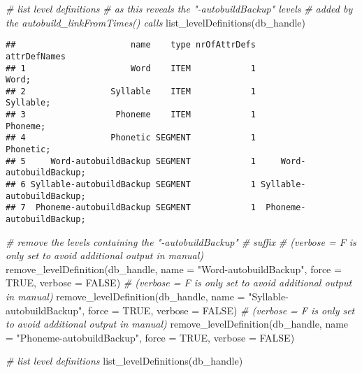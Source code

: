 \documentclass[
]{book}
\newenvironment{Shaded}{\begin{snugshade}}{\end{snugshade}}
\newcommand{\AttributeTok}[1]{\textcolor[rgb]{0.77,0.63,0.00}{#1}}
\newcommand{\CommentTok}[1]{\textcolor[rgb]{0.56,0.35,0.01}{\textit{#1}}}
\newcommand{\ConstantTok}[1]{\textcolor[rgb]{0.00,0.00,0.00}{#1}}
\newcommand{\FunctionTok}[1]{\textcolor[rgb]{0.00,0.00,0.00}{#1}}
\newcommand{\NormalTok}[1]{#1}
\newcommand{\StringTok}[1]{\textcolor[rgb]{0.31,0.60,0.02}{#1}}
\begin{document}
\begin{Shaded}
\begin{Highlighting}[]
\CommentTok{\# list level definitions}
\CommentTok{\# as this reveals the "{-}autobuildBackup" levels}
\CommentTok{\# added by the autobuild\_linkFromTimes() calls}
\FunctionTok{list\_levelDefinitions}\NormalTok{(db\_handle)}
\end{Highlighting}
\end{Shaded}

\begin{verbatim}
##                       name    type nrOfAttrDefs              attrDefNames
## 1                     Word    ITEM            1                     Word;
## 2                 Syllable    ITEM            1                 Syllable;
## 3                  Phoneme    ITEM            1                  Phoneme;
## 4                 Phonetic SEGMENT            1                 Phonetic;
## 5     Word-autobuildBackup SEGMENT            1     Word-autobuildBackup;
## 6 Syllable-autobuildBackup SEGMENT            1 Syllable-autobuildBackup;
## 7  Phoneme-autobuildBackup SEGMENT            1  Phoneme-autobuildBackup;
\end{verbatim}

\begin{Shaded}
\begin{Highlighting}[]
\CommentTok{\# remove the levels containing the "{-}autobuildBackup"}
\CommentTok{\# suffix}
\CommentTok{\# (verbose = F is only set to avoid additional output in manual)}
\FunctionTok{remove\_levelDefinition}\NormalTok{(db\_handle,}
                       \AttributeTok{name =} \StringTok{"Word{-}autobuildBackup"}\NormalTok{,}
                       \AttributeTok{force =} \ConstantTok{TRUE}\NormalTok{,}
                       \AttributeTok{verbose =} \ConstantTok{FALSE}\NormalTok{)}
\CommentTok{\# (verbose = F is only set to avoid additional output in manual)}
\FunctionTok{remove\_levelDefinition}\NormalTok{(db\_handle,}
                       \AttributeTok{name =} \StringTok{"Syllable{-}autobuildBackup"}\NormalTok{,}
                       \AttributeTok{force =} \ConstantTok{TRUE}\NormalTok{,}
                       \AttributeTok{verbose =} \ConstantTok{FALSE}\NormalTok{)}
\CommentTok{\# (verbose = F is only set to avoid additional output in manual)}
\FunctionTok{remove\_levelDefinition}\NormalTok{(db\_handle,}
                       \AttributeTok{name =} \StringTok{"Phoneme{-}autobuildBackup"}\NormalTok{,}
                       \AttributeTok{force =} \ConstantTok{TRUE}\NormalTok{,}
                       \AttributeTok{verbose =} \ConstantTok{FALSE}\NormalTok{)}

\CommentTok{\# list level definitions}
\FunctionTok{list\_levelDefinitions}\NormalTok{(db\_handle)}
\end{Highlighting}
\end{Shaded}
\end{document}
